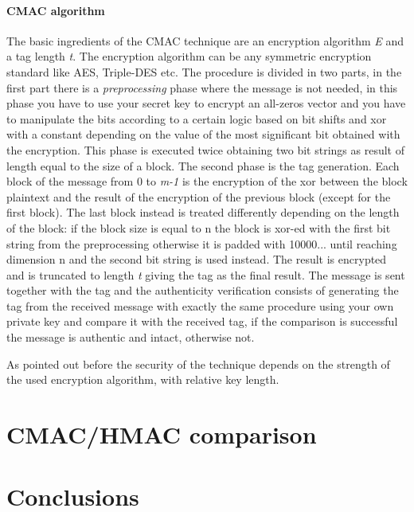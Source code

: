 \documentclass[11pt]{article}
\begin{document}
\paragraph*{CMAC algorithm}
The basic ingredients of the CMAC technique are an encryption algorithm \textit{E} and a tag length \textit{t}. The encryption algorithm can be any symmetric encryption standard like AES, Triple-DES etc.
The procedure is divided in two parts, in the first part there is a \textit{preprocessing} phase where the message is not needed, in this phase you have to use your secret key to encrypt an all-zeros vector and you have to manipulate the bits according to a certain logic based on bit shifts and xor with a constant depending on the value of the most significant bit obtained with the encryption. This phase is executed twice obtaining two bit strings as result of length equal to the size of a block.
The second phase is the tag generation. Each block of the message from 0 to \textit{m-1} is the encryption of the xor between the block plaintext and the result of the encryption of the previous block (except for the first block). The last block instead is treated differently depending on the length of the block: if the block size is equal to n the block is xor-ed with the first bit string from the preprocessing otherwise it is padded with 10000... until reaching dimension n and the second bit string is used instead. The result is encrypted and is truncated to length \textit{t} giving the tag as the final result. The message is sent together with the tag and the authenticity verification consists of generating the tag from the received message with exactly the same procedure using your own private key and compare it with the received tag, if the comparison is successful the message is authentic and intact, otherwise not.

As pointed out before the security of the technique depends on the strength of the used encryption algorithm, with relative key length.


\section{CMAC/HMAC comparison}


\section{Conclusions}
\end{document}
